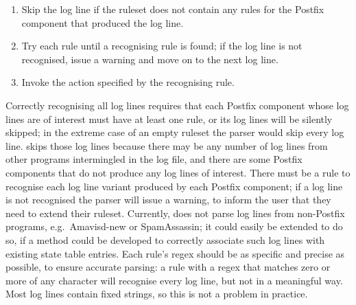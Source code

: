 \begin{enumerate}

    \squeezeitems{}

    \item Skip the log line if the ruleset does not contain any rules for
        the Postfix component that produced the log line.

    \item Try each rule until a recognising rule is found; if the log line
        is not recognised, issue a warning and move on to the next log
        line.

    \item Invoke the action specified by the recognising rule.

\end{enumerate}

Correctly recognising all log lines requires that each Postfix component
whose log lines are of interest must have at least one rule, or its log
lines will be silently skipped; in the extreme case of an empty ruleset the
parser would skip every log line.  \parsername{} skips those log lines
because there may be any number of log lines from other programs
intermingled in the log file, and there are some Postfix components that do
not produce any log lines of interest.  There must be a rule to recognise
each log line variant produced by each Postfix component; if a log line is
not recognised the parser will issue a warning, to inform the user that
they need to extend their ruleset.  Currently, \parsername{} does not parse
log lines from non-Postfix programs, e.g.\ Amavisd-new or SpamAssassin; it
could easily be extended to do so, if a method could be developed to
correctly associate such log lines with existing state table entries.  Each
rule's regex should be as specific and precise as possible, to ensure
accurate parsing: a rule with a regex that matches zero or more of any
character will recognise every log line, but not in a meaningful way.  Most
log lines contain fixed strings, so this is not a problem in practice.

